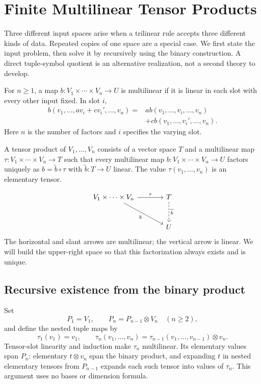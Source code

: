 \section{Finite Multilinear Tensor Products}
\label{sec:finite-tensors}
Three different input spaces arise when a trilinear rule accepts three
different kinds of data. Repeated copies of one space are a special case.
We first state the input problem, then solve it by recursively using
the binary construction. A direct tuple-symbol quotient is an alternative realization, not a
second theory to develop.
\begin{definition}[Multilinearity]
For $n\geq1$, a map $b:V_1\times\cdots\times V_n\to U$ is multilinear
if it is linear in each slot with every other input fixed. In slot $i$,
\[
\begin{split}
b(v_1,\ldots,av_i+cv_i',\ldots,v_n)
={}&a b(v_1,\ldots,v_i,\ldots,v_n)\\
&+c b(v_1,\ldots,v_i',\ldots,v_n).
\end{split}
\]
Here $n$ is the number of factors and $i$ specifies the varying slot.
\end{definition}
\begin{definition}
A tensor product of $V_1,\ldots,V_n$ consists of a vector space $T$
and a multilinear map $\tau:V_1\times\cdots\times V_n\to T$ such that
every multilinear map $b:V_1\times\cdots\times V_n\to U$ factors
uniquely as $b=\widetilde b\circ\tau$ with $\widetilde b:T\to U$ linear.
The value $\tau(v_1,\ldots,v_n)$ is an elementary tensor.
\end{definition}
\[
\begin{tikzcd}[column sep=large,row sep=large]
V_1\times\cdots\times V_n\arrow[r,"\tau"]\arrow[dr,"b"']&
T\arrow[d,dashed,"\widetilde b"]\\&U
\end{tikzcd}
\]
The horizontal and slant arrows are multilinear; the vertical arrow is
linear. We will build the upper-right space so that this factorization
always exists and is unique.

\subsection{Recursive existence from the binary product}
Set
\[
P_1=V_1,\qquad P_n=P_{n-1}\otimes V_n\quad(n\geq2),
\]
and define the nested tuple maps by
\[
\tau_1(v_1)=v_1,\qquad
\tau_n(v_1,\ldots,v_n)=\tau_{n-1}(v_1,\ldots,v_{n-1})\otimes v_n.
\]
Tensor-slot linearity and induction make $\tau_n$ multilinear.
Its elementary values span $P_n$: elementary $t\otimes v_n$ span
the binary product, and expanding $t$ in nested elementary tensors
from $P_{n-1}$ expands each such tensor into values of $\tau_n$.
This argument uses no bases or dimension formula.

